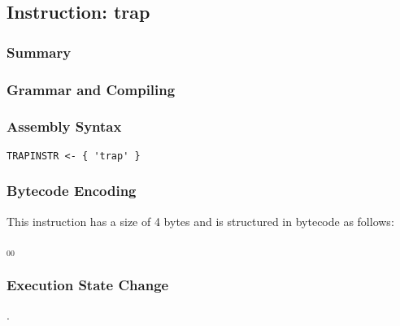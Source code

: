 \subsection{Instruction: trap}

\subsubsection{Summary}


\subsubsection{Grammar and Compiling}


\subsubsection{Assembly Syntax}

\begin{myquote}
\begin{verbatim}
TRAPINSTR <- { 'trap' }
\end{verbatim}
\end{myquote}

\subsubsection{Bytecode Encoding}

This instruction has a size of 4 bytes and is structured in bytecode as follows:

$_{00}$\ 


\subsubsection{Execution State Change}

.


